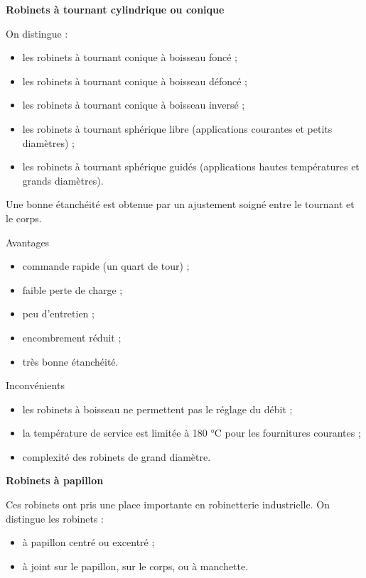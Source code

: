 \vspace{0.3cm}
\textbf{Robinets à tournant cylindrique ou conique}
\vspace{0.3cm}

On distingue :
\begin{itemize}
\item  les robinets à tournant conique à boisseau foncé ;
\item  les robinets à tournant conique à boisseau défoncé ;
\item  les robinets à tournant conique à boisseau inversé ;
\item  les robinets à tournant sphérique libre (applications courantes et petits diamètres) ;
\item  les robinets à tournant sphérique guidés (applications hautes températures et grands diamètres).

 \end{itemize}

Une bonne étanchéité est obtenue par un ajustement soigné entre le tournant et le corps.


Avantages 
\begin{itemize}

\item  commande rapide (un quart de tour) ;
\item  faible perte de charge ;
\item  peu d’entretien ;
\item  encombrement réduit ;
\item  très bonne étanchéité.

\end{itemize}

Inconvénients 
\begin{itemize}

\item  les robinets à boisseau ne permettent pas le réglage du débit ;
\item  la température de service est limitée à 180 °C pour les fournitures courantes ;
\item  complexité des robinets de grand diamètre.

\end{itemize}

\vspace{0.3cm}
\textbf{Robinets à papillon}
\vspace{0.3cm}

Ces robinets ont pris une place importante en robinetterie industrielle. On distingue les robinets :
\begin{itemize}
\item  à papillon centré ou excentré ;
\item  à joint sur le papillon, sur le corps, ou à manchette.

\end{itemize}


